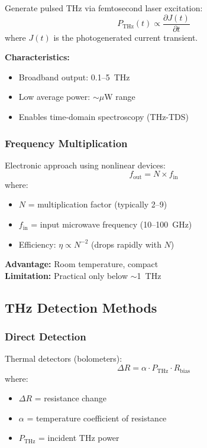 Generate pulsed THz via femtosecond laser excitation:
\begin{equation}
P_{\text{THz}}(t) \propto \frac{\partial J(t)}{\partial t}
\end{equation}
where $J(t)$ is the photogenerated current transient.

\textbf{Characteristics:}
\begin{itemize}
\item Broadband output: 0.1--5~THz
\item Low average power: $\sim$$\mu$W range
\item Enables time-domain spectroscopy (THz-TDS)
\end{itemize}

\subsubsection{Frequency Multiplication}

Electronic approach using nonlinear devices:
\begin{equation}
f_{\text{out}} = N \times f_{\text{in}}
\end{equation}
where:
\begin{itemize}
\item $N$ = multiplication factor (typically 2--9)
\item $f_{\text{in}}$ = input microwave frequency (10--100~GHz)
\item Efficiency: $\eta \propto N^{-2}$ (drops rapidly with $N$)
\end{itemize}

\textbf{Advantage:} Room temperature, compact\\
\textbf{Limitation:} Practical only below $\sim$1~THz

\subsection{THz Detection Methods}

\subsubsection{Direct Detection}

Thermal detectors (bolometers):
\begin{equation}
\Delta R = \alpha \cdot P_{\text{THz}} \cdot R_{\text{bias}}
\end{equation}
where:
\begin{itemize}
\item $\Delta R$ = resistance change
\item $\alpha$ = temperature coefficient of resistance
\item $P_{\text{THz}}$ = incident THz power
\end{itemize}

